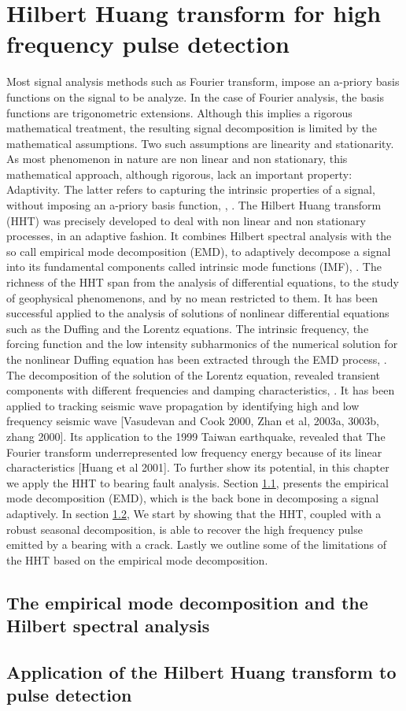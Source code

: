 \documentclass[../Main/thesis.tex]{subfiles}
\begin{document}
\chapter[Hilbert Huang transform for high frequency pulse detection]{Hilbert Huang transform for high frequency pulse detection}
\label{sec:hht}

Most signal analysis methods such as Fourier transform, impose an a-priory basis functions on the signal to be analyze. In the case of Fourier analysis, the basis functions are trigonometric extensions. Although this implies a rigorous mathematical treatment, the resulting signal decomposition is limited by the mathematical assumptions. Two such assumptions are linearity and stationarity. As most phenomenon in nature are non linear and non stationary, this mathematical approach, although rigorous, lack an important property: Adaptivity. The latter refers to capturing the intrinsic properties of a signal, without imposing an a-priory basis function, \cite{huang98}, \cite{huang08}. 
\justify 
The Hilbert Huang transform (HHT) was precisely developed to deal with non linear and non stationary processes, in an adaptive fashion. It combines Hilbert spectral analysis with the so call empirical mode decomposition (EMD), to adaptively decompose a signal into its fundamental components called intrinsic mode functions (IMF), \cite{huang98}.
The richness of the HHT span from the analysis of differential equations, to the study of geophysical phenomenons, and by no mean restricted to them. It has been successful applied to the analysis of solutions of nonlinear differential equations such as the Duffing and the Lorentz equations. The intrinsic frequency, the forcing function and the low intensity subharmonics of the numerical solution for the nonlinear Duffing equation has been extracted through the EMD process, \cite{huang98}. The decomposition of the solution of the Lorentz equation, revealed transient components with different frequencies and damping characteristics, \cite{huang98}. It has been applied to tracking seismic wave propagation by identifying high and low frequency seismic wave [Vasudevan and Cook 2000, Zhan et al, 2003a, 3003b, zhang 2000]. Its application to the 1999 Taiwan earthquake, revealed that The Fourier transform underrepresented low frequency energy because of its linear characteristics [Huang et al 2001]. To further show its potential, in this chapter we apply the HHT to bearing fault analysis.
\justify
Section \ref{sec:emd}, presents the empirical mode decomposition (EMD), which is the back bone in decomposing a signal adaptively. In section \ref{sec:pulse}, We start by showing that the HHT, coupled with a robust seasonal decomposition, is able to recover the high frequency pulse emitted by a bearing with a crack. Lastly we outline some of the limitations of the HHT based on the empirical mode decomposition.
\justify
\section{The empirical mode decomposition and the Hilbert spectral analysis}
\label{sec:emd}

\section{Application of the Hilbert Huang transform to pulse detection }
\label{sec:pulse}



\blankpage
\end{document}
